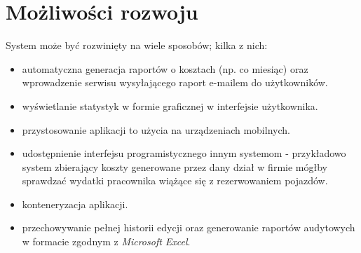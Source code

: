 \documentclass[eng,printmode,openany]{mgr}
\begin{document}
	\section{Możliwości rozwoju}
	System może być rozwinięty na wiele sposobów; kilka z nich:
	\begin{itemize}
		\item automatyczna generacja raportów o kosztach (np. co miesiąc) oraz wprowadzenie serwisu wysyłającego raport e-mailem do użytkowników.
		\item wyświetlanie statystyk w formie graficznej w interfejsie użytkownika.
		\item przystosowanie aplikacji to użycia na urządzeniach mobilnych.
		\item udostępnienie interfejsu programistycznego innym systemom - przykładowo system zbierający koszty generowane przez dany dział w firmie mógłby sprawdzać wydatki pracownika wiążące się z rezerwowaniem pojazdów.
		\item konteneryzacja aplikacji.
		\item przechowywanie pełnej historii edycji oraz generowanie raportów audytowych w formacie zgodnym z \textit{Microsoft Excel}.
	\end{itemize}
	
	
	
	
\end{document}
